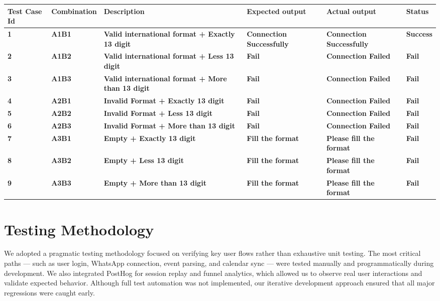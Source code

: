 \begin{longtable}{|p{1cm}|p{2cm}|p{3.5cm}|p{2.5cm}|p{2.5cm}|p{1.5cm}|}
\hline
\textbf{Test Case Id} & \textbf{Combination} & \textbf{Description} & \textbf{Expected output} & \textbf{Actual output} & \textbf{Status} \\
\hline
\textbf{1} & \textbf{A1B1} & \textbf{Valid international format + Exactly 13 digit} & \textbf{Connection Successfully} & \textbf{Connection Successfully} & \textbf{Success} \\
\hline
\textbf{2} & \textbf{A1B2} & \textbf{Valid international format + Less 13 digit} & \textbf{Fail} & \textbf{Connection Failed} & \textbf{Fail} \\
\hline
\textbf{3} & \textbf{A1B3} & \textbf{Valid international format + More than 13 digit} & \textbf{Fail} & \textbf{Connection Failed} & \textbf{Fail} \\
\hline
\textbf{4} & \textbf{A2B1} & \textbf{Invalid Format + Exactly 13 digit} & \textbf{Fail} & \textbf{Connection Failed} & \textbf{Fail} \\
\hline
\textbf{5} & \textbf{A2B2} & \textbf{Invalid Format + Less 13 digit} & \textbf{Fail} & \textbf{Connection Failed} & \textbf{Fail} \\
\hline
\textbf{6} & \textbf{A2B3} & \textbf{Invalid Format + More than 13 digit} & \textbf{Fail} & \textbf{Connection Failed} & \textbf{Fail} \\
\hline
\textbf{7} & \textbf{A3B1} & \textbf{Empty + Exactly 13 digit} & \textbf{Fill the format} & \textbf{Please fill the format} & \textbf{Fail} \\
\hline
\textbf{8} & \textbf{A3B2} & \textbf{Empty + Less 13 digit} & \textbf{Fill the format} & \textbf{Please fill the format} & \textbf{Fail} \\
\hline
\textbf{9} & \textbf{A3B3} & \textbf{Empty + More than 13 digit} & \textbf{Fill the format} & \textbf{Please fill the format} & \textbf{Fail} \\
\hline
\end{longtable}


\section{Testing Methodology}

We adopted a pragmatic testing methodology focused on verifying key user flows rather than exhaustive unit testing. The most critical paths — such as user login, WhatsApp connection, event parsing, and calendar sync — were tested manually and programmatically during development. We also integrated PostHog for session replay and funnel analytics, which allowed us to observe real user interactions and validate expected behavior. Although full test automation was not implemented, our iterative development approach ensured that all major regressions were caught early.



